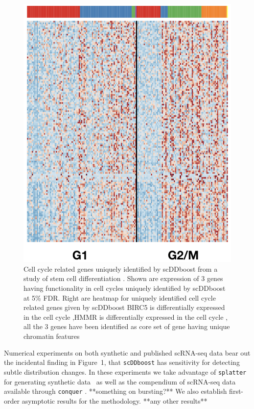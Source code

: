\documentclass[aoas,preprint]{imsart}
\begin{document}
\begin{figure}[H]
 \includegraphics[clip,width=\textwidth]{Figs/HeatUni.png}
\endminipage

 \caption{Cell cycle related genes uniquely identified by scDDboost
 from a study of stem cell differentiation . Shown are expression
of 3 genes having functionality in cell cycles uniquely identified by scDDboost at 5\% FDR. Right are heatmap for uniquely identified cell cycle related genes given by scDDboost
BIRC5 is differentially expressed in the cell cycle \citep{BIRC5},HMMR is differentially expressed in the cell cycle \citep{HMMR}, all the 3 genes have been identified as core set of gene 
having unique chromatin features \citep{RAD21}
 \label{fig:whet} }
\end{figure}


Numerical experiments  on both synthetic and published scRNA-seq data bear out the incidental finding 
in Figure~1, that \verb+scDDboost+ has sensitivity for detecting subtle distribution changes. 
  In these experiments we take advantage of
\verb+splatter+ for generating synthetic data~\citep{ref:Zappia} as well as the compendium of scRNA-seq
data available through \verb+conquer+ \citep{ref:Cq}.  **something on bursting?**
We also establish first-order asymptotic results for the methodology.    **any other results**
\end{document}
